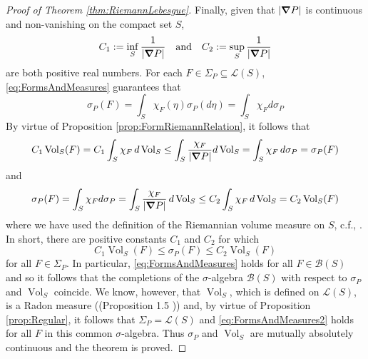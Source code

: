 \documentclass[11pt]{article}
\newcommand{\Vol}{\operatorname{Vol}}
\begin{document}
\begin{proof}[Proof of Theorem \ref{thm:RiemannLebesgue}]
Finally, given that $\abs{\grad P}$ is continuous and non-vanishing on the compact set $S$,
\begin{equation*}
    C_1 := \inf_S\frac{1}{|\grad P|}\quad\mbox{and}\quad C_2 := \sup_{S}\frac{1}{\abs{\grad P }}
\end{equation*}
are both positive real numbers. For each $F\in \Sigma_P\subseteq\mathcal{L}(S)$, \eqref{eq:FormsAndMeasures} guarantees that
\begin{equation*}
    \sigma_P(F)=\int_S\chi_F(\eta)\sigma_P(d\eta)=\int_S \chi_Fd\sigma_P
\end{equation*}
By virtue of Proposition \ref{prop:FormRiemannRelation}, it follows that
\begin{equation*}
C_1\Vol_S(F)=C_1\int_S \chi_F\,d\Vol_S\leq \int_S \frac{\chi_F}{|\grad P|}d\Vol_S=\int_S \chi_F\,d\sigma_P=\sigma_P(F)
\end{equation*}
and
\begin{equation*}
    \sigma_P(F)=\int_S\chi_F d\sigma_P=\int_S\frac{\chi_F}{|\grad P|}\,d\Vol_S\leq C_2\int_S\chi_F\,d\Vol_S=C_2\Vol_S(F)
\end{equation*}
where we have used the definition of the Riemannian volume measure on $S$, c.f., \cite{Amann2009}. In short, there are positive constants $C_1$ and $C_2$ for which
\begin{equation}\label{eq:FormsAndMeasures2}
    C_1\Vol_S(F)\leq\sigma_P(F)\leq C_2\Vol_S(F)
\end{equation}
for all $F\in\Sigma_P$. In particular, \eqref{eq:FormsAndMeasures} holds for all $F\in\mathcal{B}(S)$ and so it follows that the completions of the $\sigma$-algebra $\mathcal{B}(S)$ with respect to $\sigma_P$ and $\Vol_S$ coincide. We know, however, that $\Vol_S$, which is defined on $\mathcal{L}(S)$, is a Radon measure ((Proposition 1.5 \cite[Chapter XII]{Amann2009})) and, by virtue of Proposition \ref{prop:Regular}, it follows that $\Sigma_P=\mathcal{L}(S)$ and \eqref{eq:FormsAndMeasures2} holds for all $F$ in this common $\sigma$-algebra. Thus $\sigma_P$ and $\Vol_S$ are mutually absolutely continuous and the theorem is proved.
\end{proof}
\end{document}
